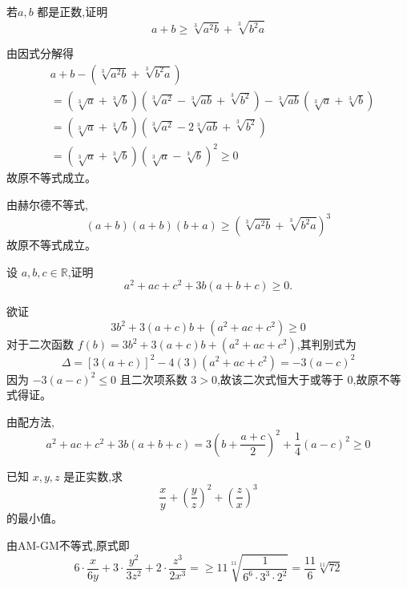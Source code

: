 \begin{questions}
    \question 若$a, b$ 都是正数,证明 
    \[
    a + b \ge \sqrt[3]{a^2b} + \sqrt[3]{b^2a}
    \]
    \begin{solution}
        由因式分解得
        \begin{align*}
        &a + b - \left(\sqrt[3]{a^2b} + \sqrt[3]{b^2a}\right) \\
        &= (\sqrt[3]{a} + \sqrt[3]{b})(\sqrt[3]{a^2} - \sqrt[3]{ab} + \sqrt[3]{b^2}) - \sqrt[3]{ab}(\sqrt[3]{a} + \sqrt[3]{b}) \\
        &= (\sqrt[3]{a} + \sqrt[3]{b})(\sqrt[3]{a^2} - 2\sqrt[3]{ab} + \sqrt[3]{b^2}) \\
        &= (\sqrt[3]{a} + \sqrt[3]{b})(\sqrt[3]{a} - \sqrt[3]{b})^2 \ge 0
        \end{align*}
        故原不等式成立。
    \end{solution}
    \begin{solution}
        由赫尔德不等式,
        \[
        (a+b)(a+b)(b+a) \ge \left(\sqrt[3]{a^2b} + \sqrt[3]{b^2a}\right)^3
        \]
        故原不等式成立。
    \end{solution}

    \question 设 $a, b, c \in \mathbb{R}$,证明
    \[
    a^2 + ac + c^2 + 3b(a + b + c) \ge 0.
    \]
    \begin{solution}
        欲证
        \[
        3b^2 + 3(a+c)b + (a^2 + ac + c^2) \ge 0
        \]
        对于二次函数 $f(b) = 3b^2 + 3(a+c)b + (a^2 + ac + c^2)$,其判别式为
        \[
        \Delta = [3(a+c)]^2 - 4(3)(a^2 + ac + c^2) = -3(a-c)^2
        \]
        因为 $-3(a-c)^2 \le 0$ 且二次项系数 $3 > 0$,故该二次式恒大于或等于 $0$,故原不等式得证。
    \end{solution}
    \begin{solution}
        由配方法,
        \[
        a^2 + ac + c^2 + 3b(a + b + c)=3 \left( b + \frac{a+c}{2} \right)^2 + \frac{1}{4}(a-c)^2\ge 0
        \]
    \end{solution}

    \question 已知 $x, y, z$ 是正实数,求 
    \[
    \frac{x}{y} + \left(\frac{y}{z}\right)^2 + \left(\frac{z}{x}\right)^3
    \]
    的最小值。
    \begin{solution}
        由AM-GM不等式,原式即
        \[
        6 \cdot \frac{x}{6y} + 3 \cdot \frac{y^2}{3z^2} + 2 \cdot \frac{z^3}{2x^3}= \ge 11 \sqrt[11]{\frac{1}{6^6 \cdot 3^3 \cdot 2^2}} = \frac{11}{6} \sqrt[11]{72}
        \]
    \end{solution}


\end{questions}
